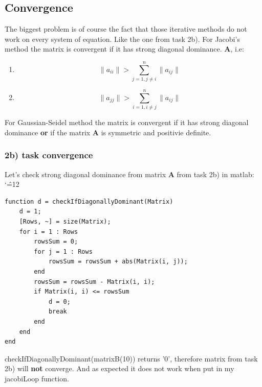 \documentclass[12pt]{report}
\newenvironment{simplechar}{%
   \catcode`\^=12
}{}
\begin{document}
\subsection{Convergence}
The biggest problem is of course the fact that those iterative methods do not work on every system of equation. Like the one from task 2b).
For Jacobi's method the matrix is convergent if it has strong diagonal dominance. \textbf{A}, i.e:
\begin{enumerate}
  \item \[ \| a_{ii} \| > \sum^n_{j=1, j \neq i} \|a_{ij} \| \]
  \item \[ \| a_{jj} \| > \sum^n_{i=1, i \neq j} \|a_{ij} \| \]
\end{enumerate}
For Gaussian-Seidel method the matrix is convergent if it has strong diagonal dominance \textbf{or} if the matrix \textbf{A} is symmetric and positivie definite.
\subsubsection{2b) task convergence }
Let's check strong diagonal dominance from matrix \textbf{A} from task 2b) in matlab:
\begin{simplechar}
\begin{lstlisting}
function d = checkIfDiagonallyDominant(Matrix)
    d = 1;
    [Rows, ~] = size(Matrix);
    for i = 1 : Rows
        rowsSum = 0;
        for j = 1 : Rows
            rowsSum = rowsSum + abs(Matrix(i, j));
        end
        rowsSum = rowsSum - Matrix(i, i);
        if Matrix(i, i) <= rowsSum
            d = 0;
            break
        end
    end
end
\end{lstlisting}
\end{simplechar}
checkIfDiagonallyDominant(matrixB(10)) returns '0', therefore matrix from task 2b) will \textbf{not} converge. And as expected it does not work when put in my jacobiLoop function.
\end{document}
